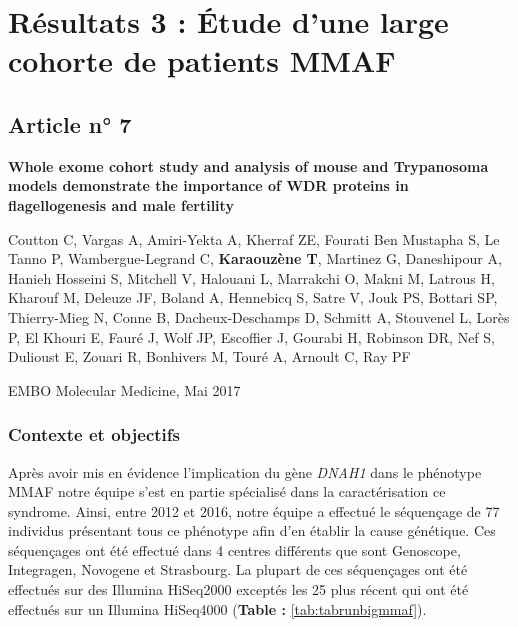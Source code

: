 \documentclass[12pt,twoside]{reedthesis}
\theoremstyle{definition}
\theoremstyle{definition}
\theoremstyle{remark}
\begin{document}
  \newpage  
  
  \section{Résultats 3 : Étude d'une large cohorte de patients
  MMAF}\label{resultats-3-etude-dune-large-cohorte-de-patients-mmaf}
  
  \subsection{Article n° 7}\label{article-n-7}
  
  \textbf{Whole exome cohort study and analysis of mouse and Trypanosoma
  models demonstrate the importance of WDR proteins in flagellogenesis and
  male fertility}
  
  Coutton C, Vargas A, Amiri-Yekta A, Kherraf ZE, Fourati Ben Mustapha S,
  Le Tanno P, Wambergue-Legrand C, \textbf{Karaouzène T}, Martinez G,
  Daneshipour A, Hanieh Hosseini S, Mitchell V, Halouani L, Marrakchi O,
  Makni M, Latrous H, Kharouf M, Deleuze JF, Boland A, Hennebicq S, Satre
  V, Jouk PS, Bottari SP, Thierry-Mieg N, Conne B, Dacheux-Deschamps D,
  Schmitt A, Stouvenel L, Lorès P, El Khouri E, Fauré J, Wolf JP,
  Escoffier J, Gourabi H, Robinson DR, Nef S, Dulioust E, Zouari R,
  Bonhivers M, Touré A, Arnoult C, Ray PF
  
  EMBO Molecular Medicine, Mai 2017
  
  \newpage
  
  \subsubsection{Contexte et objectifs}\label{contexte-et-objectifs-6}
  
  Après avoir mis en évidence l'implication du gène \emph{DNAH1} dans le
  phénotype MMAF notre équipe s'est en partie spécialisé dans la
  caractérisation ce syndrome. Ainsi, entre 2012 et 2016, notre équipe a
  effectué le séquençage de 77 individus présentant tous ce phénotype afin
  d'en établir la cause génétique. Ces séquençages ont été effectué dans 4
  centres différents que sont Genoscope, Integragen, Novogene et
  Strasbourg. La plupart de ces séquençages ont été effectués sur des
  Illumina HiSeq2000 exceptés les 25 plus récent qui ont été effectués sur
  un Illumina HiSeq4000 (\textbf{Table : }\ref{tab:tabrunbigmmaf}).
  
\end{document}
